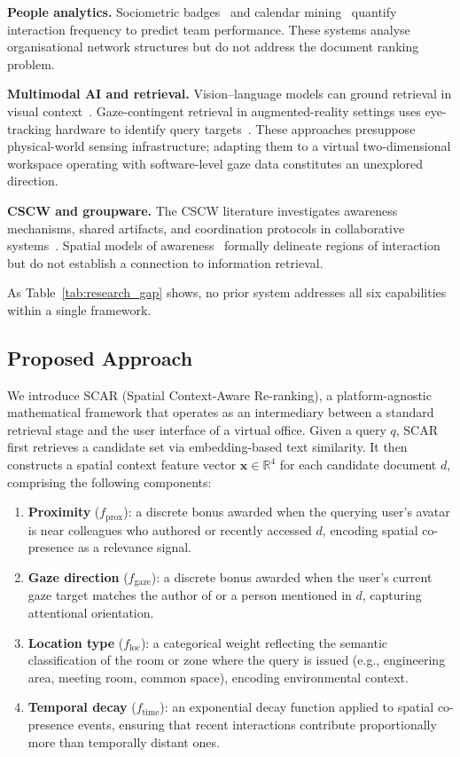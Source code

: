 \documentclass[journal]{IEEEtran}
\begin{document}
\textbf{People analytics.}
Sociometric badges~\cite{pentland_badges} and calendar
mining~\cite{calendar_mining} quantify interaction
frequency to predict team performance.  These systems analyse
organisational network structures but do not address the document
ranking problem.

\textbf{Multimodal AI and retrieval.}
Vision--language models can ground retrieval in visual
context~\cite{clip, flamingo}.  Gaze-contingent
retrieval in augmented-reality settings uses eye-tracking hardware
to identify query targets~\cite{gaze_ar}.  These approaches
presuppose physical-world sensing infrastructure; adapting them to a
virtual two-dimensional workspace operating with software-level gaze
data constitutes an unexplored direction.

\textbf{CSCW and groupware.}
The CSCW literature investigates awareness mechanisms, shared
artifacts, and coordination protocols in collaborative
systems~\cite{cscw_awareness, cscw_coord}.
Spatial models of awareness~\cite{spatial_awareness}
formally delineate regions of interaction but do not establish a
connection to information retrieval.

As Table~\ref{tab:research_gap} shows, no prior system addresses all
six capabilities within a single framework.

\subsection{Proposed Approach}
\label{sec:intro_approach}

We introduce SCAR (Spatial Context-Aware Re-ranking), a
platform-agnostic mathematical framework that operates
as an intermediary between a standard retrieval stage and the user
interface of a virtual office.  Given a query $q$, SCAR first
retrieves a candidate set via embedding-based text similarity.  It then constructs a spatial
context feature vector $\mathbf{x} \in \mathbb{R}^4$ for each
candidate document $d$, comprising the following components:

\begin{enumerate}
  \item \textbf{Proximity} ($f_{\text{prox}}$): a discrete bonus
        awarded when the querying user's avatar is near colleagues who
        authored or recently accessed $d$, encoding spatial co-presence
        as a relevance signal.
  \item \textbf{Gaze direction} ($f_{\text{gaze}}$): a discrete
        bonus awarded when the user's current gaze target matches the
        author of or a person mentioned in $d$, capturing attentional
        orientation.
  \item \textbf{Location type} ($f_{\text{loc}}$): a categorical
        weight reflecting the semantic classification of the room or
        zone where the query is issued (e.g., engineering area,
        meeting room, common space), encoding environmental context.
  \item \textbf{Temporal decay} ($f_{\text{time}}$): an exponential
        decay function applied to spatial co-presence events,
        ensuring that recent interactions contribute proportionally
        more than temporally distant ones.
\end{enumerate}
\end{document}

